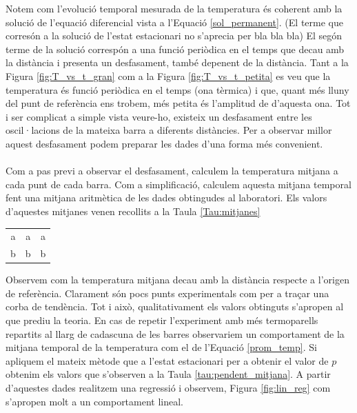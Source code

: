 \documentclass[12pt,twosides,onecolumn,openany]{article}
\newenvironment{Figura}
  {\par\medskip\noindent\minipage{\linewidth}}
  {\endminipage\par\medskip}
\begin{document}
\begin{multicols}{2}
\begin{Figura}
  \label{fig:T_vs_t_petita}
\end{Figura}
Notem com l'evolució temporal mesurada de la temperatura és coherent amb la solució de l'equació diferencial vista a l'Equació \eqref{sol_permanent}. (El terme que corresón a la solució de l'estat estacionari no s'aprecia per bla bla bla) El segón terme de la solució correspón a una funció periòdica en el temps que decau amb la distància i presenta un desfasament, també depenent de la distància. Tant a la Figura \ref{fig:T_vs_t_gran} com a la Figura \ref{fig:T_vs_t_petita} es veu que la temperatura és funció periòdica en el temps (ona tèrmica) i que, quant més lluny del punt de referència ens trobem, més petita és l'amplitud de d'aquesta ona. Tot i ser complicat a simple vista veure-ho, existeix un desfasament entre les oscil·lacions de la mateixa barra a diferents distàncies. Per a observar millor aquest desfasament podem preparar les dades d'una forma més convenient.\\\\
Com a pas previ a observar el desfasament, calculem la temperatura mitjana a cada punt de cada barra. Com a simplificació, calculem aquesta mitjana temporal fent una mitjana aritmètica de les dades obtingudes al laboratori. Els valors d'aquestes mitjanes venen recollits a la Taula \ref{Tau:mitjanes}
\begin{Figura}
  \centering
  \begin{tabular}{c|c|c}
    a & a & a \\
    b & b & b 
  \end{tabular}
  \label{Tau:mitjanes}
\end{Figura}
Observem com la temperatura mitjana decau amb la distància respecte a l'origen de referència. Clarament són pocs punts experimentals com per a traçar una corba de tendència. Tot i això, qualitativament els valors obtinguts s'apropen al que prediu la teoria. En cas de repetir l'experiment amb més termoparells repartits al llarg de cadascuna de les barres observariem un comportament de la mitjana temporal de la temperatura com el de l'Equació \eqref{prom_temp}. Si apliquem el mateix mètode que a l'estat estacionari per a obtenir el valor de $p$ obtenim els valors que s'observen a la Taula \ref{tau:pendent_mitjana}. A partir d'aquestes dades realitzem una regressió i observem, Figura \ref{fig:lin_reg} com s'apropen molt a un comportament lineal.
\begin{Figura}

\end{Figura}
\end{multicols}
\end{document}
